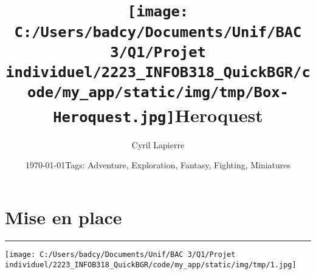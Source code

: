 \documentclass{scrartcl}%
\title{\texttt{[image: C:/Users/badcy/Documents/Unif/BAC 3/Q1/Projet individuel/2223\_INFOB318\_QuickBGR/code/my\_app/static/img/tmp/Box-Heroquest.jpg]}\break Heroquest }%
\author{Cyril Lapierre}%
\date{\today \break Tags: Adventure, Exploration, Fantasy, Fighting, Miniatures}%
\begin{document}
%
\normalsize%
\maketitle\thispagestyle{header}%
\pagestyle{header}%
\sectionfont{\color{blue}}%
\subsectionfont{\color{blue}}%
\subsubsectionfont{\color{blue}}%
\section{ Mise en place
}%
\label{sec:Miseenplace}%
\textcolor{blue}{\rule{18cm}{0.07cm}}\break%
%
\begin{center}\texttt{[image: C:/Users/badcy/Documents/Unif/BAC 3/Q1/Projet individuel/2223\_INFOB318\_QuickBGR/code/my\_app/static/img/tmp/1.jpg]}\end{center}%
\end{document}
